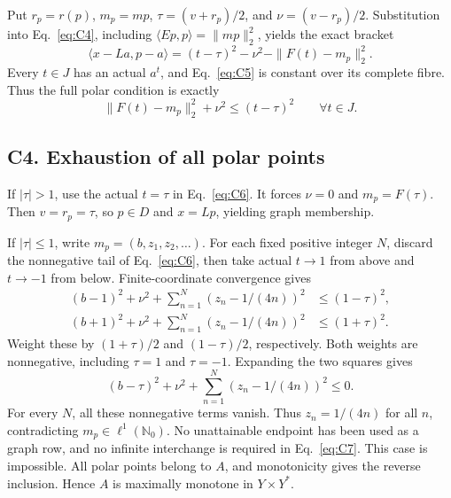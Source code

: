 \documentclass[11pt]{article}
\newcommand{\Nzero}{\mathbb N_0}
\newcommand{\pair}[2]{\langle #1,#2\rangle}
\begin{document}
Put $r_p=r(p)$, $m_p=mp$, $\tau=(v+r_p)/2$, and $\nu=(v-r_p)/2$.
Substitution into Eq.~\eqref{eq:C4}, including
$\pair{Ep}{p}=\|mp\|_2^2$, yields the exact bracket
\begin{equation}
\pair{x-La}{p-a}
 =(t-\tau)^2-\nu^2-\|F(t)-m_p\|_2^2.
\tag{C5}\label{eq:C5}
\end{equation}
Every $t\in J$ has an actual $a^t$, and Eq.~\eqref{eq:C5} is constant
over its complete fibre. Thus the full polar condition is exactly
\begin{equation}
\|F(t)-m_p\|_2^2+\nu^2\le(t-\tau)^2
\qquad\forall t\in J.
\tag{C6}\label{eq:C6}
\end{equation}

\subsection{C4. Exhaustion of all polar points}
\label{sec:C4}
If $|\tau|>1$, use the actual $t=\tau$ in Eq.~\eqref{eq:C6}. It forces
$\nu=0$ and $m_p=F(\tau)$. Then $v=r_p=\tau$, so $p\in D$ and $x=Lp$,
yielding graph membership.

If $|\tau|\le1$, write $m_p=(b,z_1,z_2,\ldots)$. For each fixed positive
integer $N$, discard the nonnegative tail of Eq.~\eqref{eq:C6}, then
take actual $t\to1$ from above and $t\to-1$ from below.
Finite-coordinate convergence gives
\begin{equation}
\begin{aligned}
(b-1)^2+\nu^2+\sum_{n=1}^N(z_n-1/(4n))^2&\le(1-\tau)^2,\\
(b+1)^2+\nu^2+\sum_{n=1}^N(z_n-1/(4n))^2&\le(1+\tau)^2.
\end{aligned}
\tag{C7}\label{eq:C7}
\end{equation}
Weight these by $(1+\tau)/2$ and $(1-\tau)/2$, respectively. Both
weights are nonnegative, including $\tau=1$ and $\tau=-1$. Expanding
the two squares gives
\begin{equation}
(b-\tau)^2+\nu^2+\sum_{n=1}^N(z_n-1/(4n))^2\le0.
\tag{C8}\label{eq:C8}
\end{equation}
For every $N$, all these nonnegative terms vanish. Thus $z_n=1/(4n)$ for
all $n$, contradicting $m_p\in\ell^1(\Nzero)$. No unattainable endpoint
has been used as a graph row, and no infinite interchange is required in
Eq.~\eqref{eq:C7}. This case is impossible. All polar points belong to
$A$, and monotonicity gives the reverse inclusion. Hence $A$ is maximally
monotone in $Y\times Y^*$.

\end{document}
